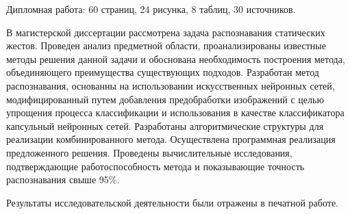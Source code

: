 \Referat
Дипломная работа: 60 страниц, 24 рисунка, 8 таблиц, 30 источников.

В магистерской диссертации рассмотрена задача распознавания статических жестов. Проведен анализ предметной области, проанализированы известные методы решения данной задачи и обоснована необходимость построения метода, объединяющего преимущества существующих подходов. Разработан метод распознавания, основанны на использовании искусственных нейронных сетей, модифицированный путем добавления предобработки изображений с целью упрощения процесса классификации и использования в качестве классификатора капсульный нейронных сетей. Разработаны алгоритмические структуры для реализации комбинированного метода. Осуществлена программная реализация предложенного решения. Прове­дены вычислительные исследования, подтверждающие работоспособ­ность метода и показывающие точность распознавания свыше 95\%.

Результаты исследовательской деятельности были отражены в печатной работе.


